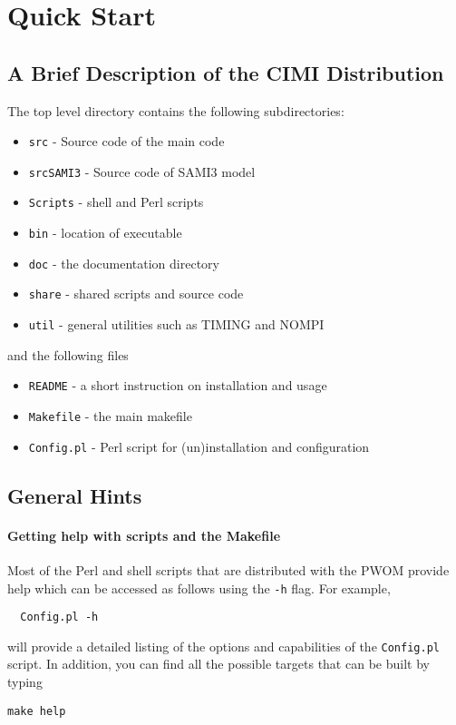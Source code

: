 
\chapter{Quick Start}

\section{A Brief Description of the CIMI Distribution}

The top level directory contains the following subdirectories:
\begin{itemize}
\item {\tt src}       - Source code of the main code
\item {\tt srcSAMI3}  - Source code of SAMI3 model
\item {\tt Scripts}   - shell and Perl scripts
\item {\tt bin}       - location of executable
\item {\tt doc}       - the documentation directory 
\item {\tt share}     - shared scripts and source code
\item {\tt util}      - general utilities such as TIMING and NOMPI
\end{itemize}
and the following files
\begin{itemize}
\item {\tt README}        - a short instruction on installation and usage
\item {\tt Makefile}      - the main makefile
\item {\tt Config.pl}     - Perl script for (un)installation and configuration
\end{itemize}

\section{General Hints}

\subsubsection{Getting help with scripts and the Makefile}

Most of the Perl and shell scripts that are distributed with the PWOM
provide help which can be accessed as follows using the {\tt -h} flag.
For example, 
\begin{verbatim}
  Config.pl -h
\end{verbatim}
will provide a detailed listing of the options and capabilities of the
{\tt Config.pl} script.  In addition, you can find all the possible
targets  that can be built by typing
\begin{verbatim}
make help
\end{verbatim}

